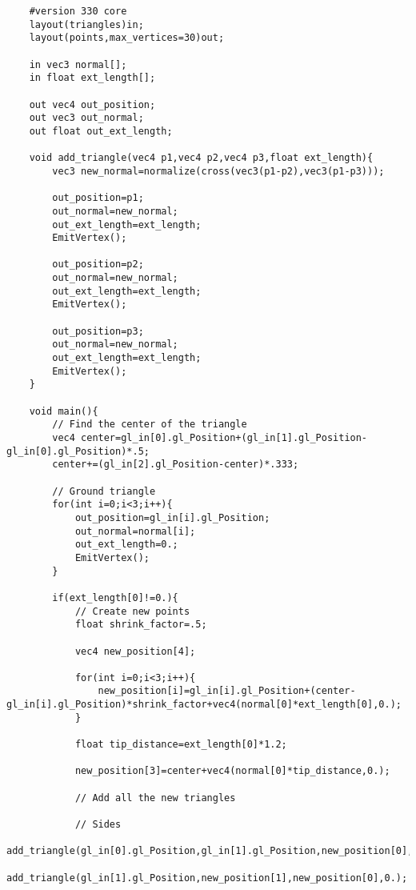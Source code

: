 \begin{minipage}{1.0\textwidth} \small
\begin{lstlisting}
    #version 330 core
    layout(triangles)in;
    layout(points,max_vertices=30)out;
    
    in vec3 normal[];
    in float ext_length[];
    
    out vec4 out_position;
    out vec3 out_normal;
    out float out_ext_length;
    
    void add_triangle(vec4 p1,vec4 p2,vec4 p3,float ext_length){
        vec3 new_normal=normalize(cross(vec3(p1-p2),vec3(p1-p3)));
        
        out_position=p1;
        out_normal=new_normal;
        out_ext_length=ext_length;
        EmitVertex();
        
        out_position=p2;
        out_normal=new_normal;
        out_ext_length=ext_length;
        EmitVertex();
        
        out_position=p3;
        out_normal=new_normal;
        out_ext_length=ext_length;
        EmitVertex();
    }
    
    void main(){
        // Find the center of the triangle
        vec4 center=gl_in[0].gl_Position+(gl_in[1].gl_Position-gl_in[0].gl_Position)*.5;
        center+=(gl_in[2].gl_Position-center)*.333;
        
        // Ground triangle
        for(int i=0;i<3;i++){
            out_position=gl_in[i].gl_Position;
            out_normal=normal[i];
            out_ext_length=0.;
            EmitVertex();
        }
        
        if(ext_length[0]!=0.){
            // Create new points
            float shrink_factor=.5;
            
            vec4 new_position[4];
            
            for(int i=0;i<3;i++){
                new_position[i]=gl_in[i].gl_Position+(center-gl_in[i].gl_Position)*shrink_factor+vec4(normal[0]*ext_length[0],0.);
            }
            
            float tip_distance=ext_length[0]*1.2;
            
            new_position[3]=center+vec4(normal[0]*tip_distance,0.);
            
            // Add all the new triangles
            
            // Sides
            add_triangle(gl_in[0].gl_Position,gl_in[1].gl_Position,new_position[0],0.);
            add_triangle(gl_in[1].gl_Position,new_position[1],new_position[0],0.);
            

\end{lstlisting}
\end{minipage}
